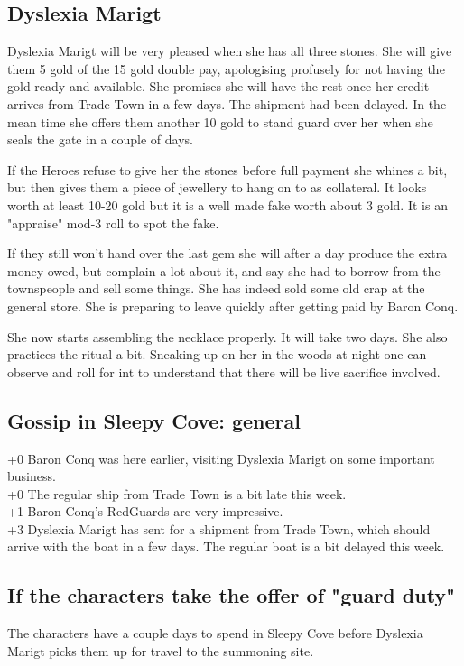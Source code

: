 \documentclass[11pt, twoside, titlepage, a4paper]{report}
\begin{document}
\subsection*{Dyslexia Marigt}
Dyslexia Marigt will be very pleased when she has all three stones. She will give them 5 gold of the 15 gold double pay, apologising profusely for not having the gold ready and available. She promises she will have the rest once her credit arrives from Trade Town in a few days. The shipment had been delayed.
In the mean time she offers them another 10 gold to stand guard over her when she seals the gate in a couple of days.

If the Heroes refuse to give her the stones before full payment she whines a bit, but then gives them a piece of jewellery to hang on to as collateral. It looks worth at least 10-20 gold but it is a well made fake worth about 3 gold. It is an "appraise" mod-3 roll to spot the fake.

If they still won't hand over the last gem she will after a day produce the extra money owed, but complain a lot about it, and say she had to borrow from the townspeople and sell some things. She has indeed sold some old crap at the general store. She is preparing to leave quickly after getting paid by Baron Conq.

She now starts assembling the necklace properly. It will take two days. She also practices the ritual a bit. Sneaking up on her in the woods at night one can observe and roll for int to understand that there will be live sacrifice involved.


\subsection*{Gossip in Sleepy Cove: general}
+0 Baron Conq was here earlier, visiting Dyslexia Marigt on some important  business. \\
+0 The regular ship from Trade Town is a bit late this week. \\
+1 Baron Conq's RedGuards are very impressive. \\
+3 Dyslexia Marigt has sent for a shipment from Trade Town, which should arrive with the boat in a few days. The regular boat is a bit delayed this week. \\


\subsection*{If the characters take the offer of "guard duty"}
The characters have a couple days to spend in Sleepy Cove before Dyslexia Marigt picks them up for travel to the summoning site.
\end{document}
